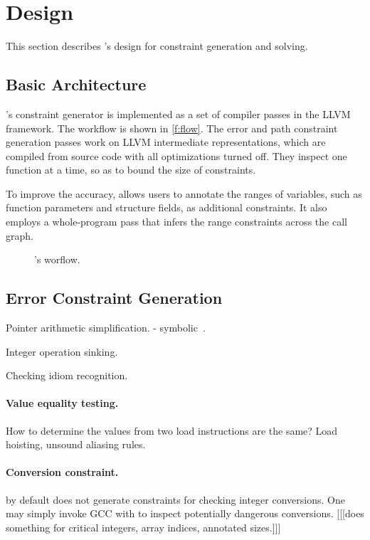 \section{Design}
\label{s:gen}

This section describes \sys's design for constraint generation and
solving.

\subsection{Basic Architecture}

\sys's constraint generator is implemented as a set of compiler
passes in the LLVM~\cite{lattner:llvm} framework.  The workflow is
shown in \autoref{f:flow}.  The error and path constraint generation
passes work on LLVM intermediate representations, which are compiled
from source code with all optimizations turned off.  They inspect
one function at a time, so as to bound the size of constraints.

To improve the accuracy, \sys allows users to annotate the ranges
of variables, such as function parameters and structure fields, as
additional constraints. It also employs a whole-program pass that
infers the range constraints across the call graph.

\begin{figure}
\centering
\resizebox{0.9\linewidth}{!}{

}
\caption{\sys's worflow.}
\label{f:flow}
\end{figure}

\subsection{Error Constraint Generation}


Pointer arithmetic simplification.
- symbolic~\cite{engelen:symbolic}.

Integer operation sinking.

Checking idiom recognition.

\paragraph{Value equality testing.}
How to determine the values from two load instructions
are the same? Load hoisting, unsound aliasing rules.

\paragraph{Conversion constraint.}
\sys by default does not generate constraints for checking integer
conversions.  One may simply invoke GCC with  to
inspect potentially dangerous conversions.
[[[\sys does something for critical integers, array indices, annotated sizes.]]]

